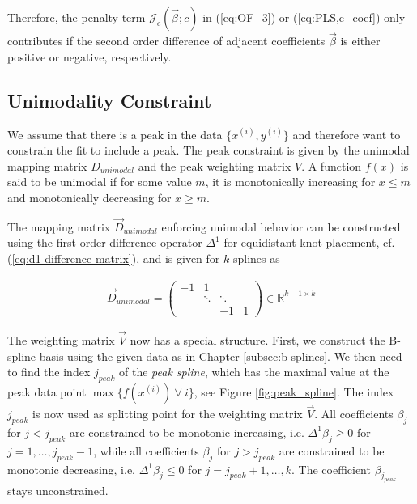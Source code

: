 Therefore, the penalty term $\mathcal{J}_c(\vec{\beta}; c)$ in (\ref{eq:OF_3}) or (\ref{eq:PLS,c_coef}) only contributes if the second order difference of adjacent coefficients $\vec{\beta}$ is either positive or negative, respectively. \cite{eilers2005unimodal}

\subsection{Unimodality Constraint}

We assume that there is a peak in the data $\{x^{(i)}, y^{(i)}\}$ and therefore want to constrain the fit to include a peak. The peak constraint is given by the unimodal mapping matrix $D_{unimodal}$ and the peak weighting matrix $V$. A function $f(x)$ is said to be unimodal if for some value $m$, it is monotonically increasing for $x \le m$ and monotonically decreasing for $x \ge m$. 

The mapping matrix $\vec{D}_{unimodal}$ enforcing unimodal behavior can be constructed using the first order difference operator $\Delta^1$ for equidistant knot placement, cf. (\ref{eq:d1-difference-matrix}), and is given for $k$ splines as 

\begin{align}\label{eq:D_c_unimodal}
	\vec{D}_{unimodal} = \begin{pmatrix} -1 & 1 \\ 
		& \ddots & \ddots  \\
		& & -1 & 1
	\end{pmatrix} \in \mathbb{R}^{k-1 \times k}
\end{align}

The weighting matrix $\vec{V}$ now has a special structure. First, we construct the B-spline basis using the given data as in Chapter \ref{subsec:b-splines}. We then need to find the index $j_{peak}$ of the \emph{peak spline}, which has the maximal value at the peak data point $\max \{f(x^{(i)}) \ \forall \ i \}$, see Figure \ref{fig:peak_spline}. The index $j_{peak}$ is now used as splitting point for the weighting matrix $\vec{V}$. All coefficients $\beta_j$ for $j < j_{peak}$ are constrained to be monotonic increasing, i.e. $\Delta^1 \beta_j \ge 0$ for $j = 1, \dots, j_{peak}-1$, while all coefficients $\beta_j$ for $j > j_{peak}$ are constrained to be monotonic decreasing, i.e. $\Delta^1 \beta_j \le 0$ for $j = j_{peak}+1, \dots, k$. The coefficient $\beta_{j_{peak}}$ stays unconstrained. \cite{eilers2005unimodal} 

